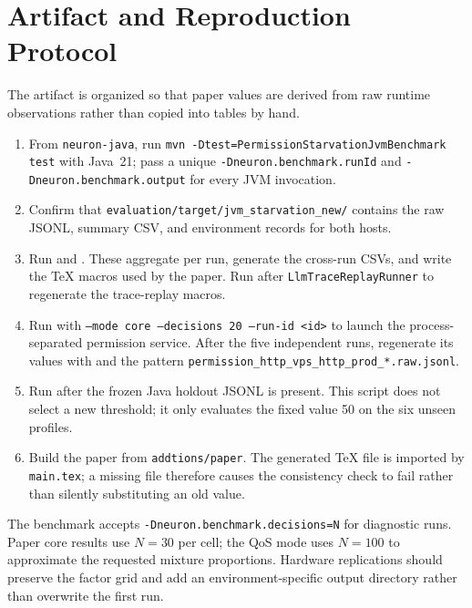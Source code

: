 \appendix
\section{Artifact and Reproduction Protocol}
\label{sec:artifact}

The artifact is organized so that paper values are derived from raw runtime
observations rather than copied into tables by hand.

\begin{enumerate}
  \item From \texttt{neuron-java}, run
  \texttt{mvn -Dtest=PermissionStarvationJvmBenchmark test} with Java~21;
  pass a unique \texttt{-Dneuron.benchmark.runId} and
  \texttt{-Dneuron.benchmark.output} for every JVM invocation.
  \item Confirm that
  \texttt{evaluation/target/jvm\_starvation\_new/} contains the raw JSONL,
  summary CSV, and environment records for both hosts.
  \item Run  and
  . These aggregate per
  run, generate the cross-run CSVs, and write the TeX macros used by the
  paper. Run  after
  \texttt{LlmTraceReplayRunner} to regenerate the trace-replay macros.
  \item Run 
  with \texttt{--mode core --decisions 20 --run-id <id>} to launch the
  process-separated permission service. After the five independent runs,
  regenerate its values with
   and the pattern
  \texttt{permission\_http\_vps\_http\_prod\_*.raw.jsonl}.
  \item Run  after
  the frozen Java holdout JSONL is present. This script does not select a new
  threshold; it only evaluates the fixed value 50 on the six unseen profiles.
  \item Build the paper from \texttt{addtions/paper}. The generated TeX file
  is imported by \texttt{main.tex}; a missing file therefore causes the
  consistency check to fail rather than silently substituting an old value.
\end{enumerate}

The benchmark accepts \texttt{-Dneuron.benchmark.decisions=N} for diagnostic
runs. Paper core results use $N=30$ per cell; the QoS mode uses $N=100$ to
approximate the requested mixture proportions. Hardware replications should
preserve the factor grid and add an environment-specific output directory
rather than overwrite the first run.


